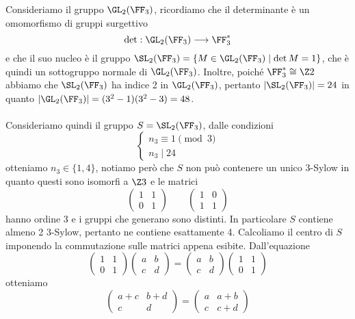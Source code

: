 \documentclass[11pt]{scrartcl}
\begin{document}
	Consideriamo il gruppo $\GL_2(\FF_3)$, ricordiamo che il determinante è 
	un omomorfismo di gruppi surgettivo
	\[
	\det: \GL_2(\FF_3) \longrightarrow \FF_3^*
	\]
	e che il suo nucleo è il gruppo $\SL_2(\FF_3) = \{M \in \GL_2(\FF_3)\mid \det M = 1\}$,
	che è quindi un sottogruppo normale di $\GL_2(\FF_3)$. Inoltre, poiché
	$\FF_3^* \cong \Z2$ abbiamo che $\SL_2(\FF_3)$ ha indice 2 in $\GL_2(\FF_3)$, pertanto 
	$|\SL_2(\FF_3)| = 24$ in quanto $|\GL_2(\FF_3)| = (3^2 - 1)(3^2 - 3) = 48$.
	\\\\
	Consideriamo quindi il gruppo $S = \SL_2(\FF_3)$, dalle condizioni 
	\[
	\begin{cases}
		n_3 \equiv 1 \pmod 3\\
		n_3 \mid 24
	\end{cases}
	\]
	otteniamo $n_3 \in \{1, 4\}$, notiamo però che $S$ non può contenere un unico 
	3-Sylow in quanto questi sono isomorfi a $\Z3$ e le matrici 
	\[
	\begin{pmatrix}
		1 & 1\\
		0 & 1
	\end{pmatrix}\qquad
	\begin{pmatrix}
		1 & 0\\
		1 & 1
	\end{pmatrix}
	\]
	hanno ordine 3 e i gruppi che generano sono distinti. In particolare $S$
	contiene almeno 2 3-Sylow, pertanto ne contiene esattamente 4.
	Calcoliamo il centro di $S$ imponendo la commutazione sulle matrici appena 
	esibite. Dall'equazione 
	\[
	\begin{pmatrix}
		1 & 1\\
		0 & 1
	\end{pmatrix}
	\begin{pmatrix}
		a & b\\
		c & d
	\end{pmatrix} = 
	\begin{pmatrix}
		a & b\\
		c & d
	\end{pmatrix}
	\begin{pmatrix}
		1 & 1\\
		0 & 1
	\end{pmatrix}
	\]
	otteniamo 
	\[
	\begin{pmatrix}
		a + c & b + d\\
		c & d
	\end{pmatrix} = 
	\begin{pmatrix}
		a & a + b\\
		c & c + d
	\end{pmatrix}
	\]
\end{document}
